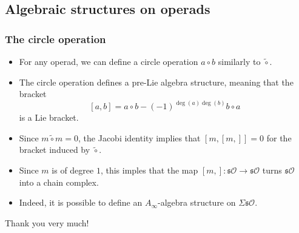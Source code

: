 \documentclass{beamer}
\theoremstyle{definition}
\begin{document}
\subsection{Algebraic structures on operads}
\begin{frame}
\frametitle{The circle operation}
\begin{itemize}
\item<1-> For any operad, we can define a circle operation $a\circ b$ similarly to $\tilde{\circ}$. %
\item The circle operation defines a pre-Lie algebra structure, meaning that the bracket
\[[a,b]=a\circ b-(-1)^{\deg(a)\deg(b)}b\circ a\]
is a Lie bracket.
\end{itemize}
\end{frame}

\begin{frame}
\begin{itemize}
\item<1-> Since $m\tilde{\circ}m=0$, the Jacobi identity implies that $[m,[m,]]=0$ for the bracket induced by $\tilde{\circ}$.
\item<2-> Since $m$ is of degree $1$, this imples that the map $[m,]:\mathfrak{s}\mathcal{O}\to\mathfrak{s}\mathcal{O}$ turns $\mathfrak{s}\mathcal{O}$ into a chain complex. %
\item<3-> Indeed, it is possible to define an $A_\infty$-algebra structure on $\Sigma\mathfrak{s}\mathcal{O}$. %
\end{itemize}
\end{frame}


\begin{frame}
	\begin{center}
	\Huge{Thank you very much!}
\end{center}
\end{frame}

\end{document}
